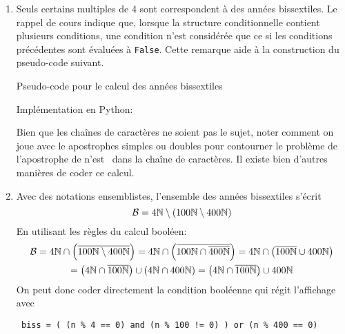 \begin{enumerate}
 \item Seuls certains multiples de 4 sont correspondent à des années bissextiles. Le rappel de cours indique que, lorsque la structure conditionnelle contient plusieurs conditions, une condition n'est considérée que ce si les conditions précédentes sont évaluées à \texttt{False}. Cette remarque aide à la construction du pseudo-code suivant.
\begin{algorithm}
  \;
  \;
  \;
\caption{Pseudo-code pour le calcul des années bissextiles}
\end{algorithm}

Implémentation en Python:

Bien que les chaînes de caractères ne soient pas le sujet, noter comment on joue avec le apostrophes simples ou doubles pour contourner le problème de l'apostrophe de \og n'est\fg~ dans la chaîne de caractères.\newline
Il existe bien d'autres manières de coder ce calcul.

 \item Avec des notations ensemblistes, l'ensemble des années bissextiles s'écrit
\begin{displaymath}
 \mathcal{B} = 4\mathbb{N} \setminus\left( 100\mathbb{N} \setminus 400\mathbb{N} \right) 
\end{displaymath}
En utilisant les règles du calcul booléen:
\begin{multline*}
 \mathcal{B} = 4\mathbb{N} \cap \left( \overline{100\mathbb{N} \setminus 400\mathbb{N}}\right)
 = 4\mathbb{N} \cap \left( \overline{100\mathbb{N} \cap \overline{400\mathbb{N}}}\right)
 = 4\mathbb{N} \cap \left( \overline{100\mathbb{N}} \cup 400\mathbb{N}\right)\\
 = \left( 4\mathbb{N} \cap \overline{100\mathbb{N}}\right)  \cup \left( 4\mathbb{N} \cap 400\mathbb{N} \right) 
 = \left( 4\mathbb{N} \cap \overline{100\mathbb{N}}\right)  \cup  400\mathbb{N}
\end{multline*}
On peut donc coder directement la condition booléenne qui régit l'affichage avec
\begin{verbatim}
 biss = ( (n % 4 == 0) and (n % 100 != 0) ) or (n % 400 == 0)
\end{verbatim}

\end{enumerate}

